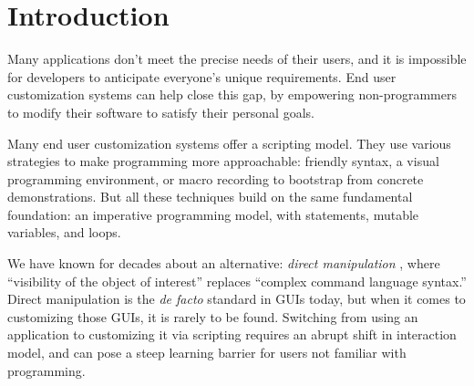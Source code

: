 \documentclass[sigplan,screen,10pt,anonymous,review]{acmart}
\begin{document}



\maketitle

\hypertarget{introduction}{%
\section{Introduction}\label{introduction}}

Many applications don't meet the precise needs of their users, and it is
impossible for developers to anticipate everyone's unique requirements.
End user customization systems can help close this gap, by empowering
non-programmers to modify their software to satisfy their personal
goals.

Many end user customization systems
\citep{cook2007, bolin2005, leshed2008, chasins2018} offer a scripting
model. They use various strategies to make programming more
approachable: friendly syntax, a visual programming environment, or
macro recording to bootstrap from concrete demonstrations. But all these
techniques build on the same fundamental foundation: an imperative
programming model, with statements, mutable variables, and loops.

We have known for decades about an alternative: \emph{direct
manipulation} \citep{shneiderman1983}, where ``visibility of the object
of interest'' replaces ``complex command language syntax.'' Direct
manipulation is the \emph{de facto} standard in GUIs today, but when it
comes to customizing those GUIs, it is rarely to be found. Switching
from using an application to customizing it via scripting requires an
abrupt shift in interaction model, and can pose a steep learning barrier
for users not familiar with programming.
\end{document}
